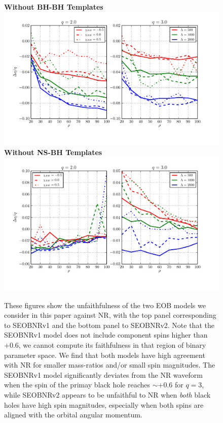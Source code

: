 \documentclass[aps,prd,amsmath,floats,floatfix, twocolumn,
superscriptaddress,nofootinbib,showpacs]{revtex4-1}
\begin{document}
% 
\begin{figure}[h]
\centering    
\textbf{Without BH-BH Templates}
\includegraphics[width=2\columnwidth]{plots/TN_EtaBias_vs_SNR_q23.pdf}\\ 
\textbf{Without NS-BH Templates}
\includegraphics[width=2\columnwidth]{plots/TT_EtaBias_vs_SNR_q23.pdf}%
\caption{These figures show the unfaithfulness of the two EOB models we consider
in this paper against NR, with the top panel corresponding to SEOBNRv1 and the bottom panel to
SEOBNRv2. Note that the SEOBNRv1 model does not include component spins
higher than $+0.6$, we cannot compute its faithfulness in that region of binary parameter space.
We find that both models have high agreement with NR for smaller mass-ratios 
and/or small spin magnitudes. The SEOBNRv1 model significantly deviates from the NR 
waveform when the spin of the primay black hole reaches $\sim +0.6$ for $q=3$, while
SEOBNRv2 appears to be unfaithful to NR when \textit{both} black holes have high spin 
magnitudes, especially when both spins are aligned with the orbital angular momentum.
}
\label{fig:SEOB_unfaith_TotalMass_Spin1z_Spin2z}
\end{figure}
\end{document}
